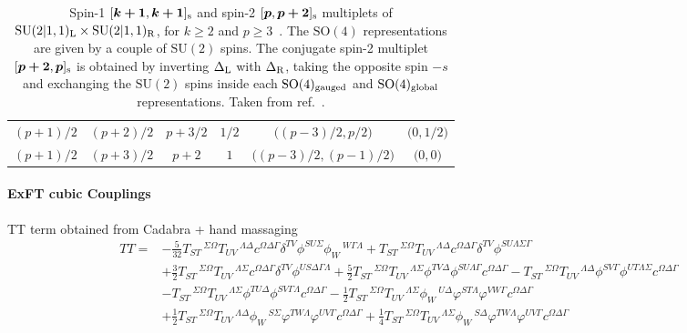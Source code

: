\documentclass[11pt]{article}
\newcommand{\SO}{\ensuremath{\mathrm{SO}}\xspace}
\newcommand{\SU}{\ensuremath{\mathrm{SU}}\xspace}
\begin{document}
\begin{table}[t!]
\begin{tabular}{cccccc}
    $(p+1)/2$ & $(p+2)/2$ & $p+3/2$ & $1/2$ & $\big((p-3)/2,p/2\big)$ & $\big(0,1/2\big)$ \\
    $(p+1)/2$ & $(p+3)/2$ & $p+2$ & $1$ & $\big((p-3)/2,(p-1)/2\big)$ & $\big(0,0\big)$
  \end{tabular}
  \caption{Spin-1 $[\boldsymbol{k+1},\boldsymbol{k+1}]_{\rm s}$ and spin-2 $[\boldsymbol{p},\boldsymbol{p+2}]_{\rm s}$ multiplets of $\SU(2\vert1,1)_{\rm L}\times \SU(2\vert1,1)_{\rm R}$, for $k\geq2$ and $p\geq3$~\cite{deBoer:1998kjm}. The $\SO(4)$ representations are given by a couple of $\SU(2)$ spins. The conjugate spin-2 multiplet $[\boldsymbol{p+2},\boldsymbol{p}]_{\rm s}$ is obtained by inverting $\Delta_{\rm L}$ with $\Delta_{\rm R}$, taking the opposite spin $-s$ and exchanging the $\SU(2)$ spins inside each $\SO(4)_{\rm gauged}$ and $\SO(4)_{\rm global}$ representations. Taken from ref.~\cite{Eloy:2020uix}.}
  \label{tab:multi20}
\end{table}


\paragraph{ExFT cubic Couplings}

TT term obtained from Cadabra + hand massaging
\begin{equation}
	\begin{split}
		TT = & - \frac{5}{32}T_{S T}\,^{\Sigma \Omega} T_{U V}\,^{\Lambda \Delta} c^{\Omega \Delta \Gamma} \delta^{T V} \phi^{S U \Sigma} \phi_{W}\,^{W \Gamma \Lambda}
		+T_{S T}\,^{\Sigma \Omega} T_{U V}\,^{\Lambda \Delta} c^{\Omega \Delta \Gamma} \delta^{T V} \phi^{S U \Lambda \Sigma \Gamma}\\
		& +\frac{3}{2}T_{S T}\,^{\Sigma \Omega} T_{U V}\,^{\Lambda \Sigma} c^{\Omega \Delta \Gamma} \delta^{T V} \phi^{U S \Delta \Gamma \Lambda} 
		+\frac{5}{2}T_{S T}\,^{\Sigma \Omega} T_{U V}\,^{\Lambda \Sigma} \phi^{T V \Delta} \phi^{S U \Lambda \Gamma} c^{\Omega \Delta \Gamma}
		-T_{S T}\,^{\Sigma \Omega} T_{U V}\,^{\Lambda \Delta} \phi^{S V \Gamma} \phi^{U T \Lambda \Sigma} c^{\Omega \Delta \Gamma} \\
		&-T_{S T}\,^{\Sigma \Omega} T_{U V}\,^{\Lambda \Sigma} \phi^{T U \Delta} \phi^{S V \Gamma \Lambda} c^{\Omega \Delta \Gamma} 
		- \frac{1}{2}T_{S T}\,^{\Sigma \Omega} T_{U V}\,^{\Lambda \Sigma} \phi_{W}\,^{U \Delta} \varphi^{S T \Lambda} \varphi^{V W \Gamma} c^{\Omega \Delta \Gamma} \\
		&+\frac{1}{2}T_{S T}\,^{\Sigma \Omega} T_{U V}\,^{\Lambda \Delta} \phi_{W}\,^{S \Sigma} \varphi^{T W \Lambda} \varphi^{U V \Gamma} c^{\Omega \Delta \Gamma}
		+\frac{1}{4}T_{S T}\,^{\Sigma \Omega} T_{U V}\,^{\Lambda \Sigma} \phi_{W}\,^{S \Delta} \varphi^{T W \Lambda} \varphi^{U V \Gamma} c^{\Omega \Delta \Gamma}
	\end{split}
\end{equation}
\end{document}
